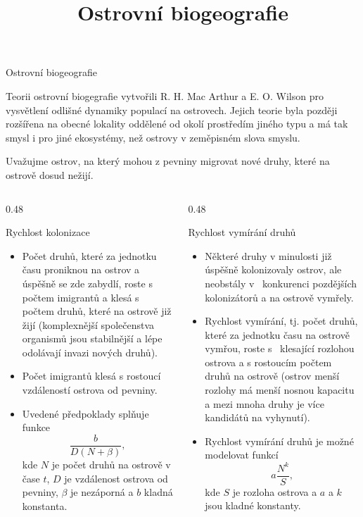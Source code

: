 \documentclass[handouts]{beamer}
\title{Ostrovní biogeografie}
\begin{document}
\begin{frame}

  \begin{center}
    \Large Ostrovní biogeografie
  \end{center}
  
  Teorii ostrovní biogegrafie vytvořili R. H. Mac Arthur a
  E. O. Wilson pro vysvětlení odlišné dynamiky populací na
  ostrovech. Jejich teorie byla později rozšířena na obecné lokality
  oddělené od okolí prostředím jiného typu a má tak smysl i pro jiné ekosystémy, než ostrovy v zeměpisném slova smyslu.

  \medskip
  Uvažujme ostrov, na který mohou z pevniny migrovat nové druhy, které
  na ostrově dosud nežijí.


  \begin{columns}
    \begin{column}[t]{0.48\hsize}
      \begin{block}{Rychlost kolonizace}
\begin{itemize}
\item Počet druhů, které za jednotku času proniknou na ostrov a úspěšně se zde zabydlí, roste s počtem
imigrantů  a klesá s počtem druhů, které na ostrově  již žijí (komplexnější společenstva organismů jsou stabilnější a lépe
odolávají invazi nových druhů).
\item  Počet imigrantů klesá s rostoucí
vzdáleností ostrova od pevniny.
\item  Uvedené předpoklady splňuje funkce
$$
 \frac b{D(N+\beta)},
$$
kde $N$ je počet druhů na ostrově v čase $t$, $D$ je vzdálenost ostrova od
pevniny, $\beta$ je nezáporná a  $b$ kladná konstanta. 
\end{itemize}
\end{block}
\end{column}
\begin{column}[t]{0.48\hsize}
  \begin{block}{Rychlost vymírání  druhů}

\begin{itemize}
\item Některé druhy v minulosti již úspěšně
kolonizovaly ostrov, ale neobstály v~ konkurenci 
pozdějších kolonizátorů a na ostrově vymřely.
\item Rychlost vymírání, tj. počet druhů, které za jednotku času na ostrově vymřou,
roste s~ klesající rozlohou ostrova a s rostoucím počtem druhů na
ostrově (ostrov menší rozlohy má menší nosnou
kapacitu a mezi mnoha druhy je více kandidátů na vyhynutí).
\item Rychlost vymírání druhů je možné modelovat funkcí
$$
 a\frac {N^k}S,
$$
kde $S$ je rozloha ostrova a $a$ a $k$ jsou kladné konstanty.
\end{itemize}
\end{block}
\end{column}
\end{columns}


\end{frame}
\end{document}
